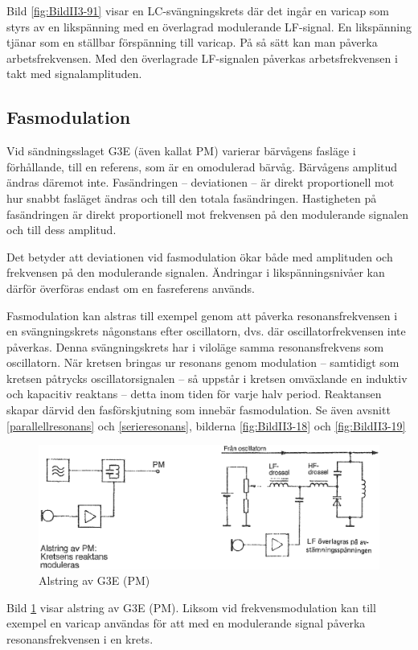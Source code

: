 Bild \ref{fig:BildII3-91} visar en LC-svängningskrets där det ingår en
varicap som styrs av en likspänning med en överlagrad modulerande LF-signal.
En likspänning tjänar som en ställbar förspänning till varicap.
På så sätt kan man påverka arbetsfrekvensen.
Med den överlagrade LF-signalen påverkas arbetsfrekvensen i takt med
signalamplituden.

\subsection{Fasmodulation}

Vid sändningsslaget G3E (även kallat PM) varierar bärvågens fasläge i
förhållande, till en referens, som är en omodulerad bärvåg.
Bärvågens amplitud ändras däremot inte.
Fasändringen -- deviationen -- är direkt proportionell mot hur snabbt fasläget
ändras och till den totala fasändringen.
Hastigheten på fasändringen är direkt proportionell mot frekvensen på den
modulerande signalen och till dess amplitud.

Det betyder att deviationen vid fasmodulation ökar både med amplituden
och frekvensen på den modulerande signalen.
Ändringar i likspänningsnivåer kan därför överföras endast om en fasreferens
används.

Fasmodulation kan alstras till exempel genom att påverka resonansfrekvensen i
en svängningskrets någonstans efter oscillatorn, dvs. där
oscillatorfrekvensen inte påverkas.
Denna svängningskrets har i viloläge samma resonansfrekvens som oscillatorn.
När kretsen bringas ur resonans genom modulation -- samtidigt som kretsen
påtrycks oscillatorsignalen -- så uppstår i kretsen omväxlande en induktiv och
kapacitiv reaktans -- detta inom tiden för varje halv period.
Reaktansen skapar därvid den fasförskjutning som innebär fasmodulation.
Se även avsnitt \ref{parallellresonans} och \ref{serieresonans}, bilderna
\ref{fig:BildII3-18} och \ref{fig:BildII3-19}

\begin{figure}
\includegraphics[width=\textwidth]{images/cropped_pdfs/bild_2_3-92.pdf}
\caption{Alstring av G3E (PM)}
\label{fig:BildII3-92}
\end{figure}

Bild \ref{fig:BildII3-92} visar alstring av G3E (PM).
Liksom vid frekvensmodulation kan till exempel en varicap användas för att
med en modulerande signal påverka resonansfrekvensen i en krets.
